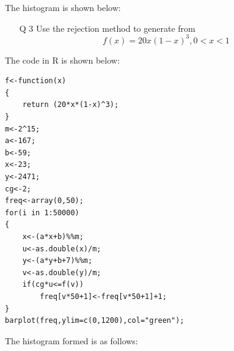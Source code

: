\documentclass[12pt]{book}
\begin{document}
\newpage
The histogram is shown below:
\begin{figure}[H]
	\centering
\end{figure}
\newpage
\begin{enumerate}
\item[Q 3] Use the rejection method to generate from $$f(x)=20x(1-x)^3, 0<x<1$$
\end{enumerate}
The code in R is shown below:\\
\begin{lstlisting}
f<-function(x)
{
	return (20*x*(1-x)^3);
}
m<-2^15;
a<-167;
b<-59;
x<-23;
y<-2471;
cg<-2;
freq<-array(0,50);
for(i in 1:50000)
{
	x<-(a*x+b)%%m;
	u<-as.double(x)/m;
	y<-(a*y+b+7)%%m;
	v<-as.double(y)/m;
	if(cg*u<=f(v))
		freq[v*50+1]<-freq[v*50+1]+1;
}
barplot(freq,ylim=c(0,1200),col="green");
\end{lstlisting}
\newpage
The histogram formed is as follows:
\begin{figure}[H]
	\centering
\end{figure}
\end{document}

